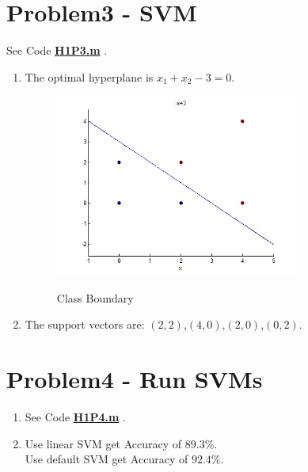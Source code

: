 \documentclass[12pt]{article}
\begin{document}
\section{Problem3 - SVM}
See Code \href{./H1P3.m}{\textbf{H1P3.m}} .
\begin{enumerate}
    \item The optimal hyperplane is $x_1+x_2-3=0$.
        \begin{figure}[H]
          \centering
          \includegraphics[width=8cm]{fig/3-1.jpg}\\
          \caption{Class Boundary}\label{fig1}
        \end{figure}
    \item The support vectors are: $(2,2)$,$(4,0)$,$(2,0)$,$(0,2)$.
    
\end{enumerate}

\section{Problem4 - Run SVMs}
\begin{enumerate}
    \item
    See Code \href{./H1P4.m}{\textbf{H1P4.m}} .
    \item
    Use linear SVM get Accuracy of $89.3\%$. \\
    Use default SVM get Accuracy of $92.4\%$. \\
\end{enumerate}
\end{document}
